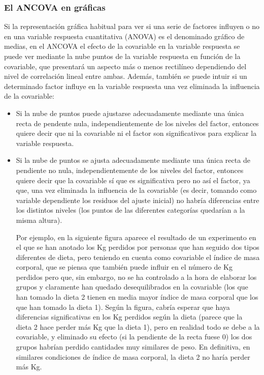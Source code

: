 \subsubsection{El ANCOVA en gráficas}
Si la representación gráfica habitual para ver si una serie de factores influyen o no en una variable respuesta cuantitativa (ANOVA) es el
denominado gráfico de medias, en el ANCOVA el efecto de la covariable en la variable respuesta se puede ver mediante la nube puntos de la
variable respuesta en función de la covariable, que presentará un aspecto más o menos rectilíneo dependiendo del nivel de correlación lineal
entre ambas. Además, también se puede intuir si un determinado factor influye en la variable respuesta una vez eliminada la influencia de la
covariable:
\begin{itemize}
\item Si la nube de puntos puede ajustarse adecuadamente mediante una única recta de pendente nula, independientemente de los niveles del
factor, entonces quiere decir que ni la covariable ni el factor son significativos para explicar la variable respuesta.

\item Si la nube de puntos se ajusta adecuadamente mediante una única recta de pendiente no nula, independientemente de los niveles del
factor, entonces quiere decir que la covariable sí que es significativa pero no así el factor, ya que, una vez eliminada la influencia de la
covariable (es decir, tomando como variable dependiente los residuos del ajuste inicial) no habría diferencias entre los distintos niveles
(los puntos de las diferentes categorías quedarían a la misma altura).

Por ejemplo, en la siguiente figura aparece el resultado de un experimento en el que se han anotado los Kg perdidos por personas que han
seguido dos tipos diferentes de dieta, pero teniendo en cuenta como covariable el índice de masa corporal, que se piensa que también puede
influir en el número de Kg perdidos pero que, sin embargo, no se ha controlado a la hora de elaborar los grupos y claramente han quedado
desequilibrados en la covariable (los que han tomado la dieta 2 tienen en media mayor índice de masa corporal que los que han tomado la
dieta 1). Según la figura, cabría esperar que haya diferencias significativas en los Kg perdidos según la dieta (parece que la dieta 2 hace
perder más Kg que la dieta 1), pero en realidad todo se debe a la covariable, y eliminado su efecto (si la pendiente de la recta fuese 0)
los dos grupos habrían perdido cantidades muy similares de peso. En definitiva, en similares condiciones de índice de masa corporal, la
dieta 2 no haría perder más Kg.


\end{itemize}
